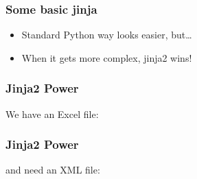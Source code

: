 \documentclass[ngerman]{beamer}
\begin{document}
\begin{frame}[fragile]
\frametitle{Some basic jinja}




\begin{itemize}
	\item Standard Python way looks easier, but\ldots
	\item When it gets more complex, jinja2 wins!
\end{itemize}

\end{frame}

\begin{frame}[fragile]
\frametitle{Jinja2 Power}

We have an Excel file:\vspace*{1em}



\end{frame}

\begin{frame}[fragile]
\frametitle{Jinja2 Power}

and need an XML file:\vspace*{1em}



\end{frame}
\end{document}
